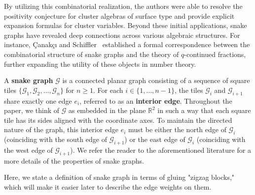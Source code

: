 \documentclass[11pt]{amsart}
\theoremstyle{definition}
\theoremstyle{remark}
\numberwithin{equation}{section}
\begin{document}
By utilizing this combinatorial realization, the authors were able to resolve the positivity conjecture for cluster algebras of surface type and provide explicit expansion formulas for cluster variables. Beyond these initial applications, snake graphs have revealed deep connections across various algebraic structures. For instance, \c{C}anak\c{c}{\i} and Schiffler~\cite{CS20} established a formal correspondence between the combinatorial structure of snake graphs and the theory of $q$-continued fractions, further expanding the utility of these objects in number theory.

A \textbf{snake graph} $\mathcal{G}$ is a connected planar graph consisting of a sequence of square tiles $\{\mathcal{G}_1, \mathcal{G}_2, \dots, \mathcal{G}_n\}$ for $n \geq 1$. For each $i \in \{1, \dots, n-1\}$, the tiles $\mathcal{G}_i$ and $\mathcal{G}_{i+1}$ share exactly one edge $e_i$, referred to as an \textbf{interior edge}. Throughout the paper, we think of $\mathcal{G}$ as embedded in the plane $\mathbb{R}^2$ in such a way that each square tile has its sides aligned with the coordinate axes. To maintain the directed nature of the graph, this interior edge $e_i$ must be either the north edge of $\mathcal{G}_i$ (coinciding with the south edge of $\mathcal{G}_{i+1}$) or the east edge of $\mathcal{G}_i$ (coinciding with the west edge of $\mathcal{G}_{i+1}$). We refer the reader to the aforementioned literature for a more details of the properties of snake graphs.

Here, we state a definition of snake graph in terms of gluing "zigzag blocks," which will make it easier later to describe the edge weights on them.
\end{document}
